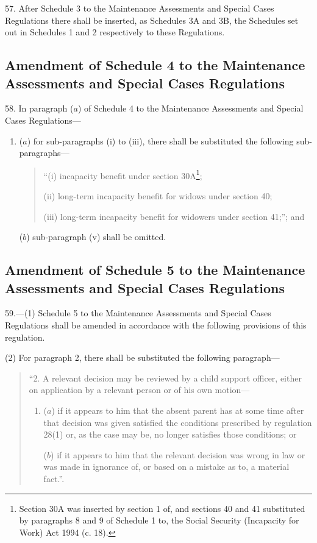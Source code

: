 \documentclass[12pt,a4paper]{article}
\begin{document}
57.  After Schedule 3 to the Maintenance Assessments and Special Cases Regulations there shall be inserted, as Schedules 3A and 3B, the Schedules set out in Schedules 1 and 2 respectively to these Regulations.

\subsection[58. Amendment of Schedule 4 to the Maintenance Assessments and Special Cases Regulations]{Amendment of Schedule 4 to the Maintenance Assessments and Special Cases Regulations}

58.  In paragraph ($a$) of Schedule 4 to the Maintenance Assessments and Special Cases Regulations—
\begin{enumerate}\item[]
($a$) for sub-paragraphs (i) to (iii), there shall be substituted the following sub-paragraphs—
\begin{quotation}
“(i) incapacity benefit under section 30A\footnote{\frenchspacing Section 30A was inserted by section 1 of, and sections 40 and 41 substituted by paragraphs 8 and 9 of Schedule 1 to, the Social Security (Incapacity for Work) Act 1994 (c. 18).};

(ii) long-term incapacity benefit for widows under section 40;

(iii) long-term incapacity benefit for widowers under section 41;”; and
\end{quotation}

($b$) sub-paragraph (v) shall be omitted.
\end{enumerate}

\subsection[59. Amendment of Schedule 5 to the Maintenance Assessments and Special Cases Regulations]{Amendment of Schedule 5 to the Maintenance Assessments and Special Cases Regulations}

59.—(1) Schedule 5 to the Maintenance Assessments and Special Cases Regulations shall be amended in accordance with the following provisions of this regulation.

(2) For paragraph 2, there shall be substituted the following paragraph—
\begin{quotation}
“2.  A relevant decision may be reviewed by a child support officer, either on application by a relevant person or of his own motion—
\begin{enumerate}\item[]
($a$) if it appears to him that the absent parent has at some time after that decision was given satisfied the conditions prescribed by regulation 28(1) or, as the case may be, no longer satisfies those conditions; or

($b$) if it appears to him that the relevant decision was wrong in law or was made in ignorance of, or based on a mistake as to, a material fact.”.
\end{enumerate}
\end{quotation}
\end{document}
